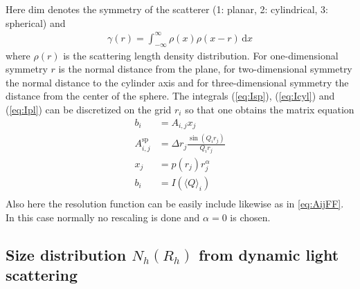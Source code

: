 Here $\mathrm{dim}$ denotes the symmetry of the scatterer (1: planar, 2: cylindrical, 3: spherical) and
\begin{align}
\gamma(r) = \int_{-\infty}^{\infty} \rho(x)\rho(x-r)\,\mathrm{d}x
\end{align}
where $\rho(r)$ is the scattering length density distribution. For one-dimensional symmetry $r$ is the normal distance from the plane, for two-dimensional symmetry the normal distance to the cylinder axis and for three-dimensional symmetry the distance from the center of the sphere.
The integrals (\ref{eq:Isp}), (\ref{eq:Icyl}) and (\ref{eq:Ipl}) can be discretized on the grid $r_i$ so that one obtains the matrix equation
\begin{align}
b_i &= A_{i,j} x_j \\
A_{i,j}^\mathrm{sp} &= \Delta r_j \frac{\sin(Q_i r_j)}{Q_i r_j}\\
x_j &= p(r_j) r_j^{\alpha}\\
b_i &= I(\langle Q\rangle_i) \\
\end{align}
Also here the resolution function can be easily include likewise as in \ref{eq:AijFF}. In this case normally no rescaling is done and $\alpha=0$ is chosen.

\subsection{Size distribution $N_h(R_h)$ from dynamic light scattering}~\\
\label{sec:DLS}

